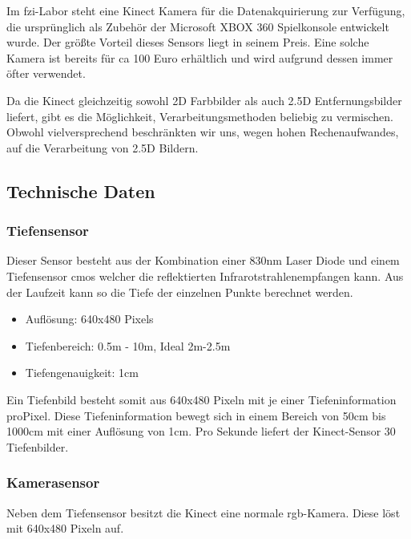 Im \gls{fzi}-Labor steht eine Kinect Kamera für die Datenakquirierung zur
 Verfügung, die ursprünglich als Zubehör der Microsoft XBOX 360 Spielkonsole
 entwickelt wurde. Der größte Vorteil dieses Sensors liegt in seinem Preis. Eine
 solche Kamera ist bereits für ca 100 Euro erhältlich und wird aufgrund dessen
 immer öfter verwendet.
 
Da die Kinect gleichzeitig sowohl 2D Farbbilder als auch 2.5D Entfernungsbilder liefert, gibt es die Möglichkeit, Verarbeitungsmethoden beliebig zu vermischen.
 Obwohl vielversprechend beschränkten wir uns, wegen hohen Rechenaufwandes, auf
 die Verarbeitung von 2.5D Bildern.
\vspace{0.3cm}

\subsection{Technische Daten}
\label{kinect_umsetzung_technische_daten}
\authorsection{\editorhamza}

\subsubsection{Tiefensensor}
\label{kinect_umsetzung_tiefensensor}

Dieser Sensor besteht aus der Kombination einer 830nm Laser Diode und einem Tiefensensor \gls{cmos} welcher die reflektierten Infrarotstrahlenempfangen kann. Aus der Laufzeit kann so die Tiefe der einzelnen Punkte berechnet werden.

\begin{itemize}
	\item Auflösung: 640x480 Pixels
	\item Tiefenbereich: 0.5m - 10m, Ideal 2m-2.5m
	\item Tiefengenauigkeit: 1cm
\end{itemize}

Ein Tiefenbild besteht somit aus 640x480 Pixeln mit je einer Tiefeninformation proPixel. Diese Tiefeninformation bewegt sich in einem Bereich von 50cm bis 1000cm mit einer Auflösung von 1cm. Pro Sekunde liefert der Kinect-Sensor 30 Tiefenbilder.

\subsubsection{Kamerasensor}

Neben dem Tiefensensor besitzt die Kinect eine normale \gls{rgb}-Kamera. Diese löst mit 640x480 Pixeln auf.

